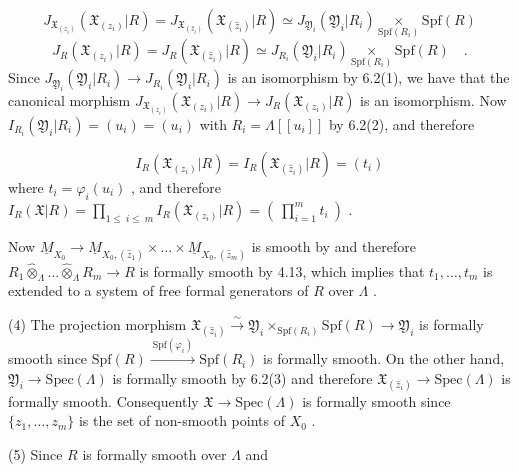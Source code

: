 \begin{equation*}
J_{\mathfrak{X}_{(z_i)}}(\mathfrak{X}_{(z_i)}|R) = J_{\mathfrak{X}_{(\widehat{z}_i)}}(\mathfrak{X}_{(\widehat{z}_i)}|R) \simeq J_{\mathfrak{Y}_i}(\mathfrak{Y}_i|R_i) \underset{\mathrm{Spf}(R_i)}{\times} \mathrm{Spf}(R)
\end{equation*}
\begin{equation*}
J_R(\mathfrak{X}_{(z_i)}|R) = J_R(\mathfrak{X}_{(\widehat{z}_i)}|R) \simeq J_{R_i}(\mathfrak{Y}_i|R_i) \underset{\mathrm{Spf}(R_i)}{\times} \mathrm{Spf}(R) \quad .
\end{equation*}
Since $J_{\mathfrak{Y}_i}(\mathfrak{Y}_i|R_i) \to J_{R_i}(\mathfrak{Y}_i|R_i)$ is an isomorphism by 6.2(1), we have that the canonical morphism $J_{\mathfrak{X}_{(z_i)}}(\mathfrak{X}_{(z_i)}|R) \to J_R(\mathfrak{X}_{(z_i)}|R)$ is an isomorphism. Now $I_{R_i}(\mathfrak{Y}_i|R_i) = (u_i) = (u_i)$ with $R_i = \Lambda[[u_i]]$ by 6.2(2), and therefore

\begin{equation*}
I_R(\mathfrak{X}_{(z_i)}|R) = I_R(\mathfrak{X}_{(\widehat{z}_i)}|R) = (t_i)
\end{equation*}
where $t_i = \varphi_i(u_i)$ , and therefore $I_R(\mathfrak{X}|R) = \prod_{1\leq\ i\leq\ m} I_R(\mathfrak{X}_{(z_i)}|R) = (\ \prod_{i=1}^{m} t_i\ )$ .

Now $\underline{M}_{X_0} \to \underline{M}_{X_0,(\widehat{z}_1)} \times \ldots \times \underline{M}_{X_0,(\widehat{z}_m)}$ is smooth by and therefore $R_1 \hat{\otimes}_{\Lambda} \ldots \hat{\otimes}_{\Lambda} R_m \to R$ is formally smooth by 4.13, which implies that $t_1,\ldots,t_m$ is extended to a system of free formal generators of $R$ over $\Lambda$ .



(4)  The projection morphism  $\mathfrak{X}_{(\widehat{z}_i)} \overset{\sim}{\rightarrow} \mathfrak{Y}_i \times_{\mathrm{Spf}(R_i)} \mathrm{Spf}(R) \rightarrow \mathfrak{Y}_i$  is formally smooth since  $\mathrm{Spf}(R) \xrightarrow{\ \mathrm{Spf}(\varphi_i)\ } \mathrm{Spf}(R_i)$  is formally smooth. On the other hand, $\mathfrak{Y}_i \rightarrow \mathrm{Spec}(\Lambda)$  is formally smooth by 6.2(3)  and therefore  $\mathfrak{X}_{(\widehat{z}_i)} \rightarrow \mathrm{Spec}(\Lambda)$  is formally smooth. Consequently  $\mathfrak{X} \rightarrow \mathrm{Spec}(\Lambda)$  is formally smooth since  $\{z_1,\dots,z_m\}$  is the set of non-smooth points of  $X_0$ .

(5)  Since  $R$  is formally smooth over  $\Lambda$  and

